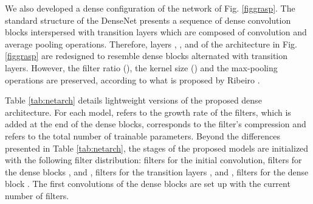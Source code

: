 \documentclass[5p]{elsarticle}
\begin{document}
We also developed a dense configuration of the network of Fig. \ref{figgrasp}. The standard structure of the DenseNet presents a sequence of dense convolution blocks interspersed with transition layers which are composed of convolution and average pooling operations. Therefore, layers , ,  and  of the architecture in Fig. \ref {figgrasp} are redesigned to resemble dense blocks alternated with transition layers. However, the filter ratio (), the kernel size () and the max-pooling operations are preserved, according to what is proposed by Ribeiro \etal\cite{ribeiro2019fast}. 

Table \ref{tab:netarch} details  lightweight versions of the proposed dense architecture. For each model,  refers to the growth rate of the filters, which is added at the end of the dense blocks,  corresponds to the filter's compression and  refers to the total number of trainable parameters. Beyond the differences presented in Table \ref{tab:netarch}, the stages of the proposed models are initialized with the following filter distribution:  filters for the initial convolution,  filters for the dense blocks ,  and ,  filters for the transition layers ,  and ,  filters for the dense block . The first convolutions of the dense blocks are set up with  the current number of filters.
\end{document}
